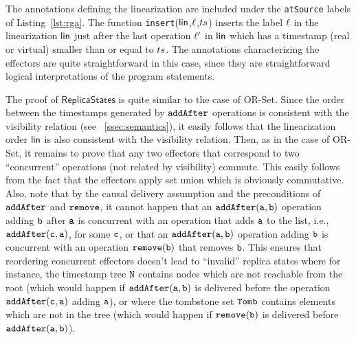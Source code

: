 The annotations defining the linearization are included under the
\lstinline|atSource| labels of Listing~\ref{lst:rga}. The function {\tt insert}($\mathsf{lin}$,$\ell$,$ts$) inserts the label $\ell$ in the linearization $\mathsf{lin}$ just after the last operation $\ell'$ in $\mathsf{lin}$ which has a timestamp (real or virtual) smaller than or equal to $ts$. The annotations characterizing the effectors are quite straightforward in this case, since they are straightforward logical interpretations of the program statements.

The proof of $\mathsf{ReplicaStates}$ is quite similar to the case of OR-Set. Since the order between the timestamps generated by ${\tt addAfter}$ operations is consistent with the visibility relation (see \sectionautorefname~\ref{ssec:semantics}), it easily follows that the linearization order $\mathsf{lin}$ is also consistent with the visibility relation. Then, as in the case of OR-Set, it remains to prove that any two effectors that correspond to two ``concurrent'' operations (not related by visibility) commute. This easily follows from the fact that the effectors apply set union which is obviously commutative. Also, note that by the causal delivery assumption and the preconditions of ${\tt addAfter}$ and ${\tt remove}$, it cannot happen that an $\alabelshort[{\tt addAfter}]{a,b}$ operation adding ${\tt b}$ after ${\tt a}$ is concurrent with an operation that adds ${\tt a}$ to the list, i.e., $\alabelshort[{\tt addAfter}]{c,a}$, for some ${\tt c}$, or that an $\alabelshort[{\tt addAfter}]{a,b}$ operation adding ${\tt b}$ is concurrent with an operation $\alabelshort[{\tt remove}]{b}$ that removes ${\tt b}$. This ensures that reordering concurrent effectors doesn't lead to ``invalid'' replica states where for instance, the timestamp tree ${\tt N}$ contains nodes which are not reachable from the root (which would happen if $\alabelshort[{\tt addAfter}]{a,b}$ is delivered before the operation $\alabelshort[{\tt addAfter}]{c,a}$ adding ${\tt a}$), or where the tombstone set ${\tt Tomb}$ contains elements which are not in the tree (which would happen if $\alabelshort[{\tt remove}]{b}$ is delivered before $\alabelshort[{\tt addAfter}]{a,b}$).

